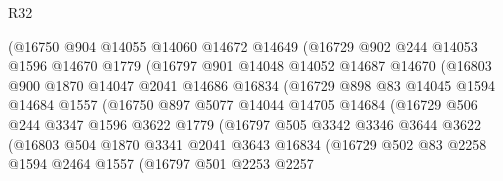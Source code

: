\begin{lexlean}{R32}
\begin{coremodule}
                    (@16750
                      @904
                      @14055
                      @14060
                      @14672
                      @14649
                      (@16729
                        @902
                        @244
                        @14053
                        @1596
                        @14670
                        @1779
                        (@16797
                          @901
                          @14048
                          @14052
                          @14687
                          @14670
                          (@16803
                            @900
                            @1870
                            @14047
                            @2041
                            @14686
                            @16834
                            (@16729
                              @898
                              @83
                              @14045
                              @1594
                              @14684
                              @1557
                              (@16750
                                @897
                                @5077
                                @14044
                                @14705
                                @14684
                                (@16729
                                  @506
                                  @244
                                  @3347
                                  @1596
                                  @3622
                                  @1779
                                  (@16797
                                    @505
                                    @3342
                                    @3346
                                    @3644
                                    @3622
                                    (@16803
                                      @504
                                      @1870
                                      @3341
                                      @2041
                                      @3643
                                      @16834
                                      (@16729
                                        @502
                                        @83
                                        @2258
                                        @1594
                                        @2464
                                        @1557
                                        (@16797
                                          @501
                                          @2253
                                          @2257

\end{coremodule}
\end{lexlean}
